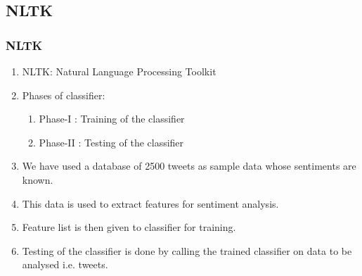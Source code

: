 \documentclass{beamer}
\begin{document}
\subsection{NLTK}
\begin{frame}
\frametitle{NLTK}
\begin{enumerate}
\item NLTK: Natural Language Processing Toolkit
\item Phases of classifier:
\begin{enumerate}
\item Phase-I : Training of the classifier
\item Phase-II : Testing of the classifier
\end{enumerate}

\item We have used a database of 2500 tweets as sample data whose sentiments are known.
\item This data is used to extract features for sentiment analysis.
\item Feature list is then given to classifier for training.
\item Testing of the classifier is done by calling the trained classifier on data to be analysed i.e. tweets.
\end{enumerate}
\end{frame}



\end{document}
